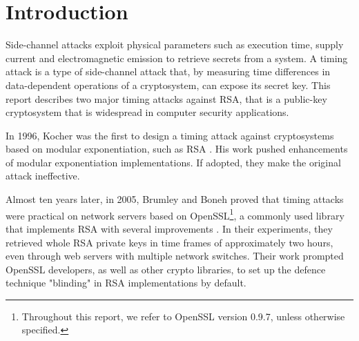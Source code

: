 \section{Introduction}

Side-channel attacks exploit physical parameters such as execution time, supply current and electromagnetic emission to retrieve secrets from a system. A timing attack is a type of side-channel attack that, by measuring time differences in data-dependent operations of a cryptosystem, can expose its secret key. This report describes two major timing attacks against RSA, that is a public-key cryptosystem that is widespread in computer security applications.

In 1996, Kocher was the first to design a timing attack against cryptosystems based on modular exponentiation, such as RSA \cite{bib:kocher}. His work pushed enhancements of modular exponentiation implementations. If adopted, they make the original attack ineffective.

Almost ten years later, in 2005, Brumley and Boneh proved that timing attacks were practical on network servers based on OpenSSL\footnote{Throughout this report, we refer to OpenSSL version 0.9.7, unless otherwise specified.}, a commonly used library that implements RSA with several improvements \cite{bib:openssl}. In their experiments, they retrieved whole RSA private keys in time frames of approximately two hours, even through web servers with multiple network switches. Their work prompted OpenSSL developers, as well as other crypto libraries, to set up the defence technique "blinding" in RSA implementations by default.


